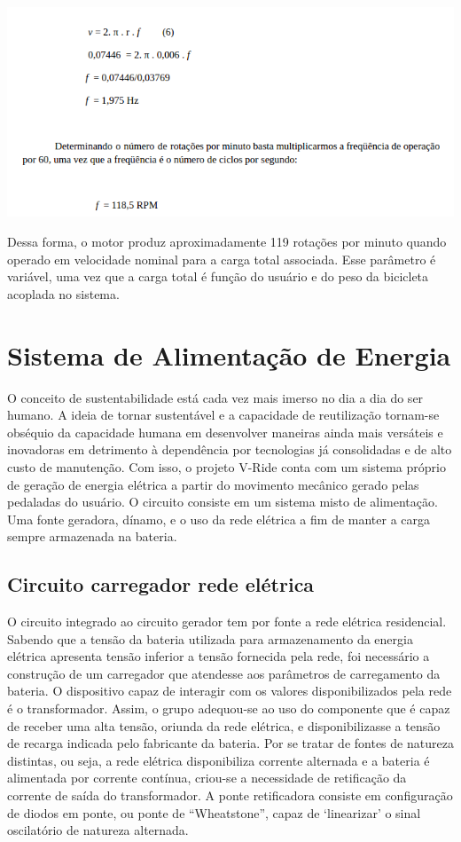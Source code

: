     \begin{center}
      \includegraphics[scale=0.7]{figuras/f5}
                \label{f5}
    \end{center}

Dessa forma, o motor produz aproximadamente 119 rotações por minuto quando operado em velocidade nominal para a carga total associada. Esse parâmetro é variável, uma vez que a carga total é função do usuário e do peso da bicicleta acoplada no sistema. 
    \section{Sistema de Alimentação de Energia }

O conceito de sustentabilidade está cada vez mais imerso no dia a dia do ser humano. A ideia de tornar sustentável e a capacidade de reutilização tornam-se obséquio da capacidade humana em desenvolver maneiras ainda mais versáteis e inovadoras em detrimento à dependência por tecnologias já consolidadas e de alto custo de manutenção. Com isso, o projeto V-Ride conta com um sistema próprio de geração de energia elétrica a partir do movimento mecânico gerado pelas pedaladas do usuário. 
O circuito consiste em um sistema misto de alimentação. Uma fonte geradora, dínamo, e o uso da rede elétrica a fim de manter a carga sempre armazenada na bateria. 
    \subsection{Circuito carregador rede elétrica}  
O circuito integrado ao circuito gerador tem por fonte a rede elétrica residencial. Sabendo que a tensão da bateria utilizada para armazenamento da energia elétrica apresenta tensão inferior a tensão fornecida pela rede, foi necessário a construção de um carregador que atendesse aos parâmetros de carregamento da bateria. 
O dispositivo capaz de interagir com os valores disponibilizados pela rede é o transformador. Assim, o grupo adequou-se ao uso do componente que é capaz de receber uma alta tensão, oriunda da rede elétrica, e disponibilizasse a tensão de recarga indicada pelo fabricante da bateria. Por se tratar de fontes de natureza distintas, ou seja, a rede elétrica disponibiliza corrente alternada e a bateria é alimentada por corrente contínua, criou-se a necessidade de retificação da corrente de saída do transformador. A ponte retificadora consiste em configuração de diodos em ponte, ou ponte de “Wheatstone”, capaz de ‘linearizar’ o sinal oscilatório de natureza alternada. 
                                
